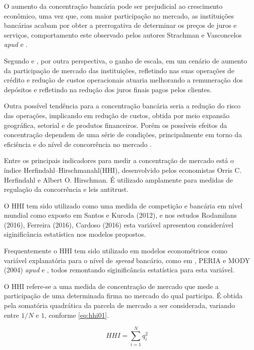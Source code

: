 \documentclass[
  12pt,
  12pt,
  openright,
  oneside,
  a4paper,
  chapter=TITLE,
  section=TITLE,
  subsection=TITLE,
  subsubsection=TITLE,
  english,
  portugues,
  sumario=tradicional]{abntex2}
\begin{document}
O aumento da concentração bancária pode ser prejudicial ao crescimento econômico, uma vez que, com maior participação no mercado, as instituições bancárias acabam por obter a prerrogativa de determinar os preços de juros e serviços, comportamento este observado pelos autores Strachman e Vasconcelos \emph{apud} \textcite{camargo:2009} e \textcite{klein:1971}.

Segundo \textcite{camargo:2009} e \textcite{dantas:2012}, por outra perspectiva, o ganho de escala, em um cenário de aumento da participação de mercado das instituições, refletindo nas suas operações de crédito e redução de custos operacionais atuaria melhorando a remuneração dos depósitos e refletindo na redução dos juros finais pagos pelos clientes.

Outra possível tendência para a concentração bancária seria a redução do risco
das operações, implicando em redução de custos, obtida por meio expansão
geográfica, setorial e de produtos financeiros. Porém os possíveis efeitos da
concentração dependem de uma série de condições, principalmente em torno da
eficiência e do nível de concorrência no mercado \cite{camargo:2009}.

Entre os principais indicadores para medir a concentração de mercado está o índice Herfindahl--Hirschmanahl(HHI), desenvolvido pelos economistas Orris C. Herfindahl e Albert O. Hirschman. É utilizado amplamente para medidas de regulação da concorrência e leis antitrust.

O HHI tem sido utilizado como uma medida de competição e bancária em nível mundial como exposto em Santos e Kuroda (2012), e nos estudos Rodamilans (2016), Ferreira (2016), Cardoso (2016) esta variável apresentou considerável siginificância estatística nos modelos propostos.

Frequentemente o HHI tem sido utilizado em modelos econométricos como variável explanatória para o nível de \emph{spread} bancário, como em \textcite{dantas:2012}, PERIA e MODY (2004) \emph{apud} \textcite{leal:2006} e \textcite{almeida:2013}, todos remontando siginificância estatística para esta variável.

O HHI refere-se a uma medida de concentração de mercado que mede a participação de uma determinada firma no mercado do qual participa. É obtida pela somatória quadrática da parcela de mercado a ser considerada, variando entre \(1/N\) e \(1\), conforme \autoref{eq:hhi01}.

\begin{equation}\label{eq:hhi01}
HHI = \sum_{i=1}^{N}q_i^2
\end{equation}
\end{document}
